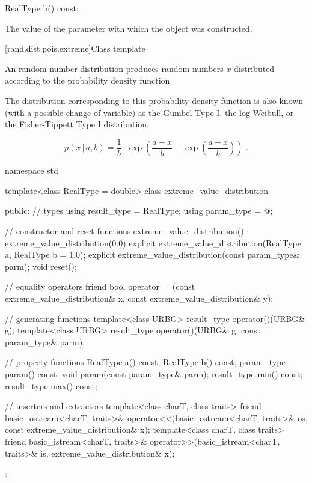 %
\begin{itemdecl}
RealType b() const;
\end{itemdecl}

\begin{itemdescr}
\pnum
\returns
The value of the  parameter
 with which the object was constructed.
\end{itemdescr}


[rand.dist.pois.extreme]{Class template }
%

\pnum
An  random number distribution
produces random numbers $x$
distributed according to
the probability density function
\begin{footnote}
The distribution corresponding to
 this probability density function
 is also known
 (with a possible change of variable)
 as the Gumbel Type I,
 the log-Weibull,
 or the Fisher-Tippett Type I
 distribution.
\end{footnote}
\[ p(x\,|\,a,b) = \frac{1}{b}
     \cdot \exp\left(\frac{a-x}{b} - \exp\left(\frac{a-x}{b}\right)\right)
     \text{ .} \]

%
%
\begin{codeblock}
namespace std {
  template<class RealType = double>
  class extreme_value_distribution {
  public:
    // types
    using result_type = RealType;
    using param_type  = @\unspec@;

    // constructor and reset functions
    extreme_value_distribution() : extreme_value_distribution(0.0) {}
    explicit extreme_value_distribution(RealType a, RealType b = 1.0);
    explicit extreme_value_distribution(const param_type& parm);
    void reset();

    // equality operators
    friend bool operator==(const extreme_value_distribution& x,
                           const extreme_value_distribution& y);

    // generating functions
    template<class URBG>
      result_type operator()(URBG& g);
    template<class URBG>
      result_type operator()(URBG& g, const param_type& parm);

    // property functions
    RealType a() const;
    RealType b() const;
    param_type param() const;
    void param(const param_type& parm);
    result_type min() const;
    result_type max() const;

    // inserters and extractors
    template<class charT, class traits>
      friend basic_ostream<charT, traits>&
        operator<<(basic_ostream<charT, traits>& os, const extreme_value_distribution& x);
    template<class charT, class traits>
      friend basic_istream<charT, traits>&
        operator>>(basic_istream<charT, traits>& is, extreme_value_distribution& x);
  };
}
\end{codeblock}


